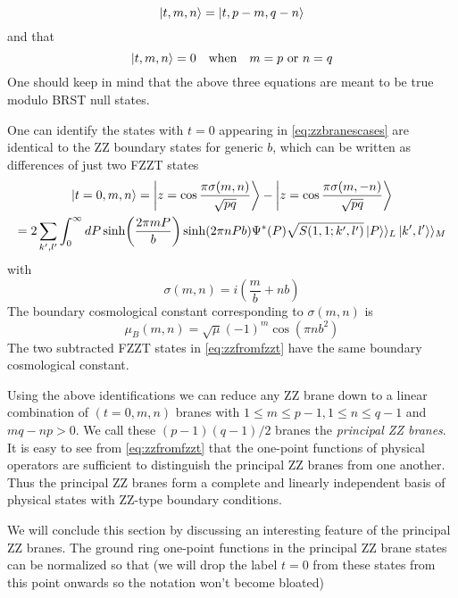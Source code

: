 \begin{equation}
\ket{t,m,n} = \ket{t,p-m,q-n}
\end{equation}
and that
\begin{equation}
\ket{t,m,n} = 0\quad \textnormal{when}\quad m=p\textnormal{ or } n=q
\end{equation}
One should keep in mind that the above three equations are meant to be true modulo BRST null states.
\par
One can identify the states with $t=0$ appearing in \eqref{eq:zzbranescases} are identical to the ZZ boundary states for generic $b$, which can be written as differences of just two FZZT states
\begin{multline}
\ket{t=0,m,n} = \ket{z=\cos\frac{\pi\sigma(m,n)}{\sqrt{pq}}} - \ket{z=\cos\frac{\pi\sigma(m, -n)}{\sqrt{pq}}}\\
= 2\sum_{k',l'}\int_0^\infty{dP\sinh(\frac{2\pi m P}{b})\sinh(2\pi n P b)\Psi^*(P)\sqrt{S(1,1;k',l')}\ket{P}\rangle_L\ket{k',l'}\rangle_M}
\label{eq:zzfromfzzt}
\end{multline}
with
\begin{equation}
\sigma(m,n) = i(\frac{m}{b}+nb)
\end{equation}
The boundary cosmological constant corresponding to $\sigma(m,n)$ is
\begin{equation}
\mu_B(m,n) = \sqrt{\mu}(-1)^m\cos(\pi nb^2)
\end{equation}
The two subtracted FZZT states in \eqref{eq:zzfromfzzt} have the same boundary cosmological constant.
\par
Using the above identifications we can reduce any ZZ brane down to a linear combination of $(t=0,m,n)$ branes with $1\leq m\leq p-1, 1\leq n\leq q-1$ and $mq - np > 0$. We call these $(p-1)(q-1)/2$ branes the \textit{principal ZZ branes}. It is easy to see from \eqref{eq:zzfromfzzt} that the one-point functions of physical operators are sufficient to distinguish the principal ZZ branes from one another. Thus the principal ZZ branes form a complete and linearly independent basis of physical states with ZZ-type boundary conditions.
\par
We will conclude this section by discussing an interesting feature of the principal ZZ branes. The ground ring one-point functions in the principal ZZ brane states can be normalized so that (we will drop the label $t=0$ from these states from this point onwards so the notation won't become bloated)


